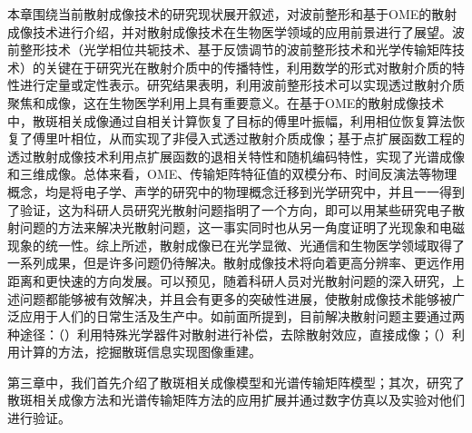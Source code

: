 本章围绕当前散射成像技术的研究现状展开叙述，对波前整形和基于OME的散射成像技术进行介绍，并对散射成像技术在生物医学领域的应用前景进行了展望。波前整形技术（光学相位共轭技术、基于反馈调节的波前整形技术和光学传输矩阵技术）的关键在于研究光在散射介质中的传播特性，利用数学的形式对散射介质的特性进行定量或定性表示。研究结果表明，利用波前整形技术可以实现透过散射介质聚焦和成像，这在生物医学利用上具有重要意义。在基于OME的散射成像技术中，散斑相关成像通过自相关计算恢复了目标的傅里叶振幅，利用相位恢复算法恢复了傅里叶相位，从而实现了非侵入式透过散射介质成像；基于点扩展函数工程的透过散射成像技术利用点扩展函数的退相关特性和随机编码特性，实现了光谱成像和三维成像。总体来看，OME、传输矩阵特征值的双模分布、时间反演法等物理概念，均是将电子学、声学的研究中的物理概念迁移到光学研究中，并且一一得到了验证，这为科研人员研究光散射问题指明了一个方向，即可以用某些研究电子散射问题的方法来解决光散射问题，这一事实同时也从另一角度证明了光现象和电磁现象的统一性。综上所述，散射成像已在光学显微、光通信和生物医学领域取得了一系列成果，但是许多问题仍待解决。散射成像技术将向着更高分辨率、更远作用距离和更快速的方向发展。可以预见，随着科研人员对光散射问题的深入研究，上述问题都能够被有效解决，并且会有更多的突破性进展，使散射成像技术能够被广泛应用于人们的日常生活及生产中。如前面所提到，目前解决散射问题主要通过两种途径：（）利用特殊光学器件对散射进行补偿，去除散射效应，直接成像；（）利用计算的方法，挖掘散斑信息实现图像重建。

第三章中，我们首先介绍了散斑相关成像模型和光谱传输矩阵模型；其次，研究了散斑相关成像方法和光谱传输矩阵方法的应用扩展并通过数字仿真以及实验对他们进行验证。
